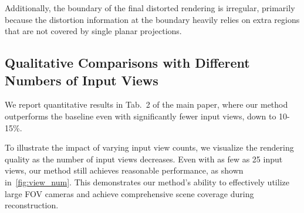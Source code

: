 Additionally, the boundary of the final distorted rendering is irregular, primarily because the distortion information at the boundary heavily relies on extra regions that are not covered by single planar projections.

\subsection{Qualitative Comparisons with Different Numbers of Input Views}
We report quantitative results in Tab.~2 of the main paper, where our method outperforms the baseline even with significantly fewer input views, down to 10-15\%. 

To illustrate the impact of varying input view counts, we visualize the rendering quality as the number of input views decreases. Even with as few as 25 input views, our method still achieves reasonable performance, as shown in~\cref{fig:view_num}. This demonstrates our method's ability to effectively utilize large FOV cameras and achieve comprehensive scene coverage during reconstruction.


\begin{figure*}[t]
    \centering
    \setlength{\tabcolsep}{1pt}
    \caption{\textbf{Qualitative Evaluation of Reconstruction with Varying Numbers of Large FOV Inputs}. Our method achieves high-quality reconstruction even with a relatively small number of input images, thanks to our hybrid distortion representation and cubemap resampling.}
    \label{fig:view_num}
\end{figure*}


